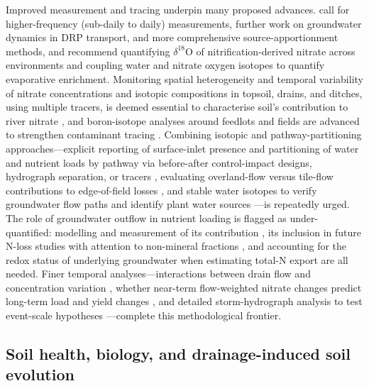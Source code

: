 \documentclass[11pt]{article}
\begin{document}
Improved measurement and tracing underpin many proposed advances. \textcite{Williams2022} call for higher-frequency (sub-daily to daily) measurements, further work on groundwater dynamics in DRP transport, and more comprehensive source-apportionment methods, and \textcite{Hu2024} recommend quantifying $\delta^{18}$O of nitrification-derived nitrate across environments and coupling water and nitrate oxygen isotopes to quantify evaporative enrichment. Monitoring spatial heterogeneity and temporal variability of nitrate concentrations and isotopic compositions in topsoil, drains, and ditches, using multiple tracers, is deemed essential to characterise soil's contribution to river nitrate \parencite{Briand2017}, and boron-isotope analyses around feedlots and fields are advanced to strengthen contaminant tracing \parencite{Komor1997}. Combining isotopic and pathway-partitioning approaches---explicit reporting of surface-inlet presence and partitioning of water and nutrient loads by pathway via before-after control-impact designs, hydrograph separation, or tracers \parencite{Flores2021}, evaluating overland-flow versus tile-flow contributions to edge-of-field losses \parencite{Kokulan2019}, and stable water isotopes to verify groundwater flow paths and identify plant water sources \parencite{Islam2022,YliHalla2022}---is repeatedly urged. The role of groundwater outflow in nutrient loading is flagged as under-quantified: modelling and measurement of its contribution \parencite{Turunen2013}, its inclusion in future N-loss studies with attention to non-mineral fractions \parencite{Jokinen2024}, and accounting for the redox status of underlying groundwater when estimating total-N export \parencite{Barkle2021} are all needed. Finer temporal analyses---interactions between drain flow and concentration variation \parencite{Lagzdins2015}, whether near-term flow-weighted nitrate changes predict long-term load and yield changes \parencite{Danalatos2022}, and detailed storm-hydrograph analysis to test event-scale hypotheses \parencite{Kladivko2004}---complete this methodological frontier.

\subsection{Soil health, biology, and drainage-induced soil evolution}
\end{document}
